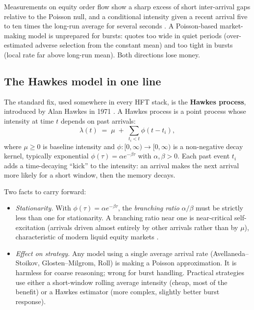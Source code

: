 Measurements on equity order flow show a sharp excess of short
inter-arrival gaps relative to the Poisson null, and a
conditional intensity given a recent arrival five to ten times
the long-run average for several seconds \citeBouchaud. A
Poisson-based market-making model is unprepared for bursts:
quotes too wide in quiet periods (over-estimated adverse
selection from the constant mean) and too tight in bursts (local
rate far above long-run mean). Both directions lose money.

\subsection{The Hawkes model in one line}

The standard fix, used somewhere in every HFT stack, is the
\textbf{Hawkes process}, introduced by Alan Hawkes in 1971
\citep{hawkes1971spectra}. A Hawkes process is a point process
whose intensity at time $t$ depends on past arrivals:
\begin{equation}
  \label{eq:hawkes}
  \lambda(t) \;=\; \mu \;+\; \sum_{t_i < t} \phi(t - t_i),
\end{equation}
where $\mu \ge 0$ is baseline intensity and
$\phi : [0,\infty) \to [0, \infty)$ is a non-negative decay
kernel, typically exponential
$\phi(\tau) = \alpha e^{-\beta \tau}$ with $\alpha, \beta > 0$.
Each past event $t_i$ adds a time-decaying ``kick'' to the
intensity: an arrival makes the next arrival more likely for a
short window, then the memory decays.

Two facts to carry forward:
\begin{itemize}
  \item \emph{Stationarity.} With
  $\phi(\tau) = \alpha e^{-\beta \tau}$, the \emph{branching
  ratio} $\alpha/\beta$ must be strictly less than one for
  stationarity. A branching ratio near one is near-critical
  self-excitation (arrivals driven almost entirely by other
  arrivals rather than by $\mu$), characteristic of modern
  liquid equity markets \citeBouchaud.
  \item \emph{Effect on strategy.} Any model using a single
  average arrival rate (Avellaneda--Stoikov, Glosten--Milgrom,
  Roll) is making a Poisson approximation. It is harmless for
  coarse reasoning; wrong for burst handling. Practical
  strategies use either a short-window rolling average intensity
  (cheap, most of the benefit) or a Hawkes estimator (more
  complex, slightly better burst response).
\end{itemize}

